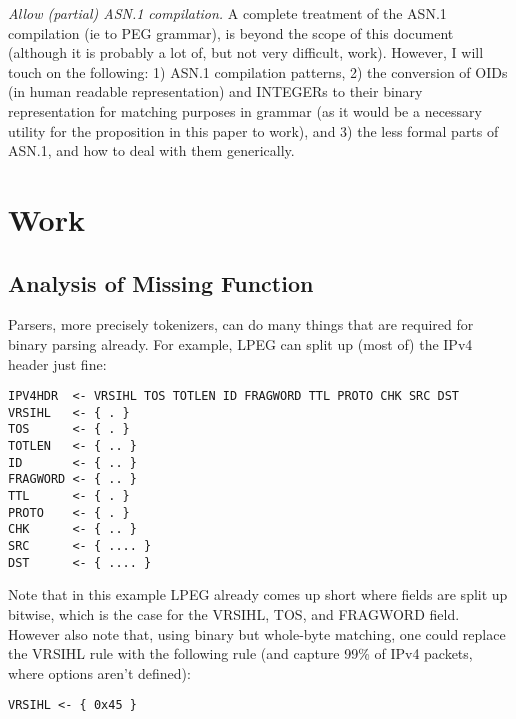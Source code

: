 \textit{Allow (partial) ASN.1 compilation.} A complete treatment of the ASN.1 
compilation (ie to PEG grammar), is beyond the scope of this document 
(although it is probably a lot of, but not very difficult, work). However, 
I will touch on the following: 1) ASN.1 compilation patterns, 2) the 
conversion of OIDs (in human readable representation) and INTEGERs to 
their binary representation for matching purposes in grammar (as it would 
be a necessary utility for the proposition in this paper to work), and 3) 
the less formal parts of ASN.1, and how to deal with them generically.

\newpage
\section{Work}

\subsection{Analysis of Missing Function}
Parsers, more precisely tokenizers, can do many things that are required 
for binary parsing already. For example, LPEG can split up (most of) the 
IPv4 header just fine:

\begin{changemargin}{-60mm}{0mm}
\begin{myquote}
\begin{verbatim}
IPV4HDR  <- VRSIHL TOS TOTLEN ID FRAGWORD TTL PROTO CHK SRC DST
VRSIHL   <- { . }
TOS      <- { . }
TOTLEN   <- { .. }
ID       <- { .. }
FRAGWORD <- { .. }
TTL      <- { . }
PROTO    <- { . }
CHK      <- { .. }
SRC      <- { .... }
DST      <- { .... }
\end{verbatim}
\end{myquote}
\end{changemargin}

Note that in this example LPEG already comes up short where fields are 
split up bitwise, which is the case for the VRSIHL, TOS, and FRAGWORD 
field. However also note that, using binary but whole-byte matching, one 
could replace the VRSIHL rule with the following rule (and capture 99\% of 
IPv4 packets, where options aren’t defined):

\begin{changemargin}{-60mm}{0mm}
\begin{myquote}
\begin{verbatim}
VRSIHL <- { 0x45 }
\end{verbatim}
\end{myquote}
\end{changemargin}

